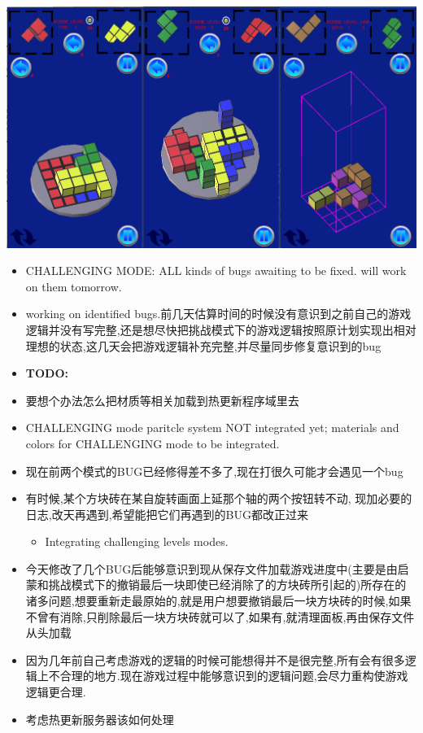 \documentclass[9pt, b5paper]{article}
\begin{document}
\includegraphics[width=.9\linewidth]{./pic/readme_20221115_220027.png}
\begin{itemize}
\item CHALLENGING MODE: ALL kinds of bugs awaiting to be fixed. will work on them tomorrow.
\item working on identified bugs.前几天估算时间的时候没有意识到之前自己的游戏逻辑并没有写完整,还是想尽快把挑战模式下的游戏逻辑按照原计划实现出相对理想的状态,这几天会把游戏逻辑补充完整,并尽量同步修复意识到的bug
\item \textbf{TODO:}
\item 要想个办法怎么把材质等相关加载到热更新程序域里去
\item CHALLENGING mode paritcle system NOT integrated yet; materials and colors for CHALLENGING mode to be integrated.
\item 现在前两个模式的BUG已经修得差不多了,现在打很久可能才会遇见一个bug
\item 有时候,某个方块砖在某自旋转画面上延那个轴的两个按钮转不动, 现加必要的日志,改天再遇到,希望能把它们再遇到的BUG都改正过来
\begin{itemize}
\item Integrating challenging levels modes.
\end{itemize}
\item 今天修改了几个BUG后能够意识到现从保存文件加载游戏进度中(主要是由启蒙和挑战模式下的撤销最后一块即使已经消除了的方块砖所引起的)所存在的诸多问题,想要重新走最原始的,就是用户想要撤销最后一块方块砖的时候,如果不曾有消除,只削除最后一块方块砖就可以了,如果有,就清理面板,再由保存文件从头加载
\item 因为几年前自己考虑游戏的逻辑的时候可能想得并不是很完整,所有会有很多逻辑上不合理的地方.现在游戏过程中能够意识到的逻辑问题,会尽力重构使游戏逻辑更合理.
\item 考虑热更新服务器该如何处理
\end{itemize}
\end{document}
